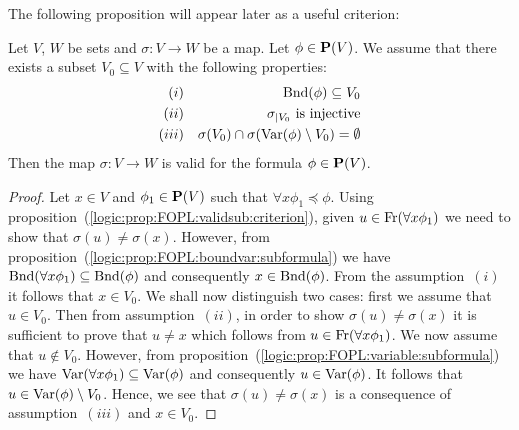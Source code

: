 The following proposition will appear later as a useful criterion:
\begin{prop}\label{logic:prop:FOPL:validsub:minimalextension}
    Let $V$, $W$ be sets and $\sigma:V\to W$ be a map. Let $\phi\in\mbox{${\bf P}(V)$}$.
    We assume that there exists a subset $V_{0}\subseteq V$ with the
    following properties:
    \begin{eqnarray*}
        (i)&&\mbox{\rm Bnd}(\phi)\subseteq V_{0}
        \\
        (ii)&&\mbox{$\sigma_{|V_{0}}$ is injective}
        \\
        (iii)&&\sigma(V_{0})\cap\sigma(\mbox{\rm Var}(\phi)\setminus V_{0})=\emptyset
    \end{eqnarray*}
    Then the map $\sigma:V\to W$ is valid for the formula $\phi\in\mbox{${\bf P}(V)$}$.
\end{prop}
\begin{proof}
Let $x\in V$ and $\phi_{1}\in\mbox{${\bf P}(V)$}$ such that $\forall
x\phi_{1}\preceq\phi$. Using
proposition~(\ref{logic:prop:FOPL:validsub:criterion}), given
$u\in\mbox{\rm Fr}(\forall x\phi_{1})$ we need to show that
$\sigma(u)\neq\sigma(x)$. However, from
proposition~(\ref{logic:prop:FOPL:boundvar:subformula}) we have
$\mbox{\rm Bnd}(\forall x\phi_{1})\subseteq\mbox{\rm Bnd}(\phi)$ and consequently
$x\in\mbox{\rm Bnd}(\phi)$. From the assumption~$(i)$ it follows that $x\in
V_{0}$. We shall now distinguish two cases: first we assume that
$u\in V_{0}$. Then from assumption~$(ii)$, in order to show
$\sigma(u)\neq\sigma(x)$ it is sufficient to prove that $u\neq x$
which follows from $u\in\mbox{\rm Fr}(\forall x\phi_{1})$. We now assume
that $u\not\in V_{0}$. However, from
proposition~(\ref{logic:prop:FOPL:variable:subformula}) we have
$\mbox{\rm Var}(\forall x\phi_{1})\subseteq\mbox{\rm Var}(\phi)$ and consequently
$u\in\mbox{\rm Var}(\phi)$. It follows that $u\in\mbox{\rm Var}(\phi)\setminus V_{0}$.
Hence, we see that $\sigma(u)\neq\sigma(x)$ is a consequence of
assumption~$(iii)$ and $x\in V_{0}$.
\end{proof}
